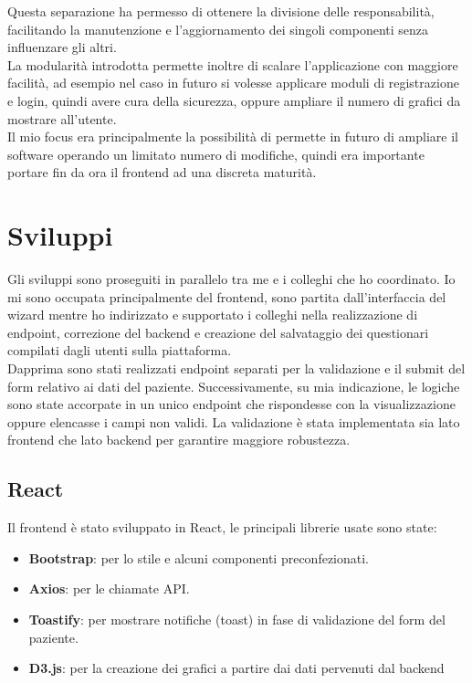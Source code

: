 \noindent Questa separazione ha permesso di ottenere la divisione delle responsabilità, facilitando la manutenzione e l'aggiornamento dei singoli componenti senza influenzare gli altri.\\
La modularità introdotta permette inoltre di scalare l'applicazione con maggiore facilità, ad esempio nel caso in futuro si volesse applicare moduli di registrazione e login, quindi avere cura della sicurezza, oppure ampliare il numero di grafici da mostrare all'utente. \\
Il mio focus era principalmente la possibilità di permette in futuro di ampliare il software operando un limitato numero di modifiche, quindi era importante portare fin da ora il frontend ad una discreta maturità.

\section{Sviluppi}
Gli sviluppi sono proseguiti in parallelo tra me e i colleghi che ho coordinato. Io mi sono occupata principalmente del frontend, sono partita dall'interfaccia del wizard mentre ho indirizzato e supportato i colleghi nella realizzazione di endpoint, correzione del backend e creazione del salvataggio dei questionari compilati dagli utenti sulla piattaforma.\\
Dapprima sono stati realizzati endpoint separati per la validazione e il submit del form relativo ai dati del paziente. Successivamente, su mia indicazione, le logiche sono state accorpate in un unico endpoint che rispondesse con la visualizzazione oppure elencasse i campi non validi. La validazione è stata implementata sia lato frontend che lato backend per garantire maggiore robustezza.\\

\subsection{React}
Il frontend è stato sviluppato in React, le principali librerie usate sono state:
\begin{itemize}
    \item \textbf{Bootstrap}: per lo stile e alcuni componenti preconfezionati.
    \item \textbf{Axios}: per le chiamate API.
    \item \textbf{Toastify}: per mostrare notifiche (toast) in fase di validazione del form del paziente.
    \item \textbf{D3.js}: per la creazione dei grafici a partire dai dati pervenuti dal backend
\end{itemize}


